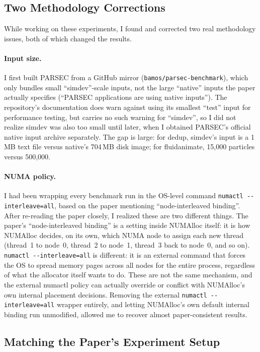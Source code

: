 \documentclass[11pt,a4paper]{article}
\begin{document}
\subsection{Two Methodology Corrections}

While working on these experiments, I found and corrected two real methodology issues, both of which changed the results.

\paragraph{Input size.}
I first built PARSEC from a GitHub mirror (\texttt{bamos/parsec-benchmark}), which only bundles small ``simdev''-scale inputs, not the large ``native'' inputs the paper actually specifies (``PARSEC applications are using native inputs''). The repository's documentation does warn against using its smallest ``test'' input for performance testing, but carries no such warning for ``simdev'', so I did not realize simdev was also too small until later, when I obtained PARSEC's official native input archive separately. The gap is large: for dedup, simdev's input is a 1\,MB text file versus native's 704\,MB disk image; for fluidanimate, 15{,}000 particles versus 500{,}000.

\paragraph{NUMA policy.}
I had been wrapping every benchmark run in the OS-level command \texttt{numactl -{}-interleave=all}, based on the paper mentioning ``node-interleaved binding''. After re-reading the paper closely, I realized these are two different things. The paper's ``node-interleaved binding'' is a setting inside NUMAlloc itself: it is how NUMAlloc decides, on its own, which NUMA node to assign each new thread (thread~1 to node~0, thread~2 to node~1, thread~3 back to node~0, and so on). \texttt{numactl -{}-interleave=all} is different: it is an external command that forces the OS to spread memory pages across all nodes for the entire process, regardless of what the allocator itself wants to do. These are not the same mechanism, and the external numactl policy can actually override or conflict with NUMAlloc's own internal placement decisions. Removing the external \texttt{numactl -{}-interleave=all} wrapper entirely, and letting NUMAlloc's own default internal binding run unmodified, allowed me to recover almost paper-consistent results.

\subsection{Matching the Paper's Experiment Setup}
\end{document}
